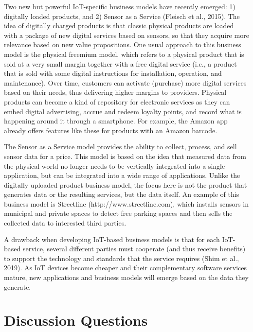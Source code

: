 \documentclass[
  letterpaper,
  DIV=11,
  numbers=noendperiod]{scrreprt}
\begin{document}
Two new but powerful IoT-specific business models have recently emerged:
1) digitally loaded products, and 2) Sensor as a Service (Fleisch et
al., 2015). The idea of digitally charged products is that classic
physical products are loaded with a package of new digital services
based on sensors, so that they acquire more relevance based on new value
propositions. One usual approach to this business model is the physical
freemium model, which refers to a physical product that is sold at a
very small margin together with a free digital service (i.e., a product
that is sold with some digital instructions for installation, operation,
and maintenance). Over time, customers can activate (purchase) more
digital services based on their needs, thus delivering higher margins to
providers. Physical products can become a kind of repository for
electronic services as they can embed digital advertising, accrue and
redeem loyalty points, and record what is happening around it through a
smartphone. For example, the Amazon app already offers features like
these for products with an Amazon barcode.

The Sensor as a Service model provides the ability to collect, process,
and sell sensor data for a price. This model is based on the idea that
measured data from the physical world no longer needs to be vertically
integrated into a single application, but can be integrated into a wide
range of applications. Unlike the digitally uploaded product business
model, the focus here is not the product that generates data or the
resulting services, but the data itself. An example of this business
model is Streetline (http://www.streetline.com), which installs sensors
in municipal and private spaces to detect free parking spaces and then
sells the collected data to interested third parties.

A drawback when developing IoT-based business models is that for each
IoT-based service, several different parties must cooperate (and thus
receive benefits) to support the technology and standards that the
service requires (Shim et al., 2019). As IoT devices become cheaper and
their complementary software services mature, new applications and
business models will emerge based on the data they generate.

\hypertarget{discussion-questions-8}{%
\section{Discussion Questions}\label{discussion-questions-8}}
\end{document}
